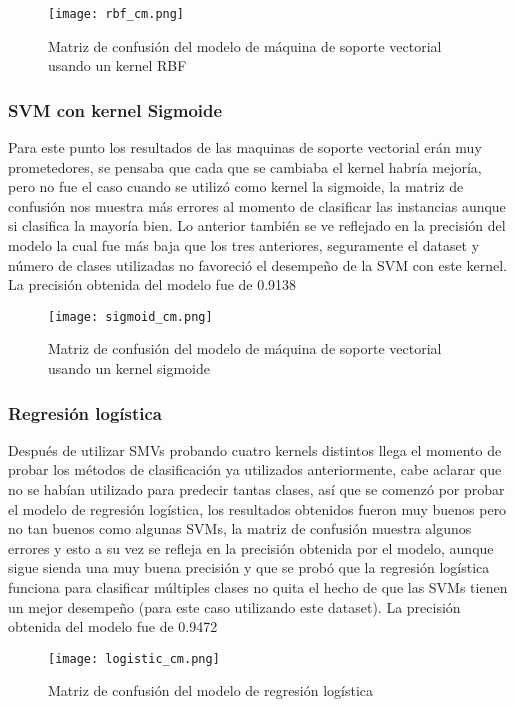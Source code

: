 \documentclass[sigconf,authorversion,nonacm]{acmart}
\begin{document}
\begin{figure}[H]
  \centering
  \texttt{[image: rbf\_cm.png]}
  \caption{Matriz de confusión del modelo de máquina de soporte vectorial usando un kernel RBF}
\end{figure}

\subsubsection{SVM con kernel Sigmoide}
Para este punto los resultados de las maquinas de soporte vectorial erán muy prometedores, se pensaba que cada que se cambiaba el kernel habría mejoría, pero no fue el caso cuando se utilizó como kernel la sigmoide, la matriz de confusión nos muestra más errores al momento de clasificar las instancias aunque si clasifica la mayoría bien. Lo anterior también se ve reflejado en la precisión del modelo la cual fue más baja que los tres anteriores, seguramente el dataset y número de clases utilizadas no favoreció el desempeño de la SVM con este kernel.
La precisión obtenida del modelo fue de 0.9138

\begin{figure}[H]
  \centering
  \texttt{[image: sigmoid\_cm.png]}
  \caption{Matriz de confusión del modelo de máquina de soporte vectorial usando un kernel sigmoide}
\end{figure}

\subsubsection{Regresión logística}
Después de utilizar SMVs probando cuatro kernels distintos llega el momento de probar los métodos de clasificación ya utilizados anteriormente, cabe aclarar que no se habían utilizado para predecir tantas clases, así que se comenzó por probar el modelo de regresión logística, los resultados obtenidos fueron muy buenos pero no tan buenos como algunas SVMs, la matriz de confusión muestra algunos errores y esto a su vez se refleja en la precisión obtenida por el modelo, aunque sigue sienda una muy buena precisión y que se probó que la regresión logística funciona para clasificar múltiples clases no quita el hecho de que las SVMs tienen un mejor desempeño (para este caso utilizando este dataset).
La precisión obtenida del modelo fue de 0.9472

\begin{figure}[H]
  \centering
  \texttt{[image: logistic\_cm.png]}
  \caption{Matriz de confusión del modelo de regresión logística}
\end{figure}
\end{document}
